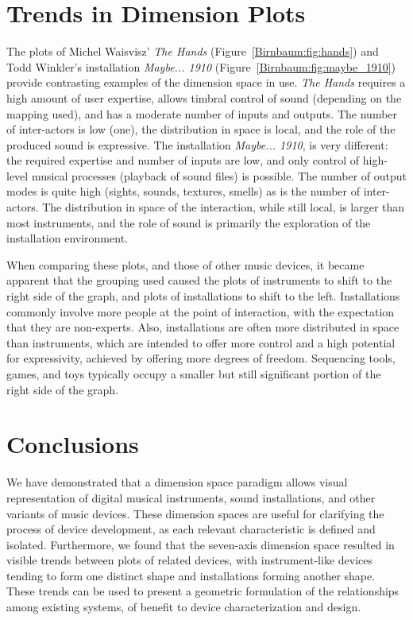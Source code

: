 {{\section{Trends in Dimension Plots}

The plots of Michel Waisvisz' \emph{The Hands} (Figure~\ref{Birnbaum:fig:hands}) and Todd Winkler's installation \emph{Maybe... 1910} (Figure~\ref{Birnbaum:fig:maybe_1910}) provide contrasting examples of the dimension space in use. \emph{The Hands} requires a high amount of user expertise, allows timbral control of sound (depending on the mapping used), and has a moderate number of inputs and outputs. The number of inter-actors is low (one), the distribution in space is local, and the role of the produced sound is expressive. The installation \emph{Maybe... 1910}, is very different: the required expertise and number of inputs are low, and only control of high-level musical processes (playback of sound files) is possible. The number of output modes is quite high (sights, sounds, textures, smells) as is the number of inter-actors. The distribution in space of the interaction, while still local, is larger than most instruments, and the role of sound is primarily the exploration of the installation environment.

When comparing these plots, and those of other music devices, it became apparent that the grouping used caused the plots of instruments to shift to the right side of the graph, and plots of installations to shift to the left. Installations commonly involve more people at the point of interaction, with the expectation that they are non-experts. Also, installations are often more distributed in space than instruments, which are intended to offer more control and a high potential for expressivity, achieved by offering more degrees of freedom. Sequencing tools, games, and toys typically occupy a smaller but still significant portion of the right side of the graph.

\section{Conclusions}

We have demonstrated that a dimension space paradigm allows visual representation of digital musical instruments, sound installations, and other variants of music devices. These dimension spaces are useful for clarifying the process of device development, as each relevant characteristic is defined and isolated. Furthermore, we found that the seven-axis dimension space resulted in visible trends between plots of related devices, with instrument-like devices tending to form one distinct shape and installations forming another shape. These trends can be used to present a geometric formulation of the relationships among existing systems, of benefit to device characterization and design.

}}
